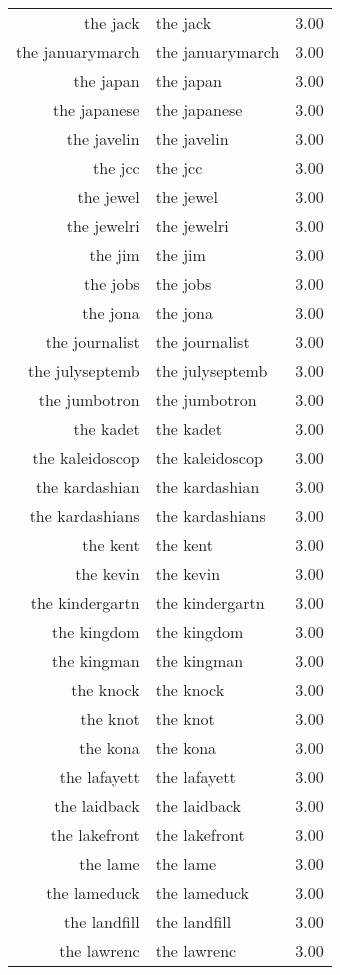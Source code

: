 \begin{table}[ht]
\begin{tabular}{rlr}
  the jack & the jack & 3.00 \\ 
  the januarymarch & the januarymarch & 3.00 \\ 
  the japan & the japan & 3.00 \\ 
  the japanese & the japanese & 3.00 \\ 
  the javelin & the javelin & 3.00 \\ 
  the jcc & the jcc & 3.00 \\ 
  the jewel & the jewel & 3.00 \\ 
  the jewelri & the jewelri & 3.00 \\ 
  the jim & the jim & 3.00 \\ 
  the jobs & the jobs & 3.00 \\ 
  the jona & the jona & 3.00 \\ 
  the journalist & the journalist & 3.00 \\ 
  the julyseptemb & the julyseptemb & 3.00 \\ 
  the jumbotron & the jumbotron & 3.00 \\ 
  the kadet & the kadet & 3.00 \\ 
  the kaleidoscop & the kaleidoscop & 3.00 \\ 
  the kardashian & the kardashian & 3.00 \\ 
  the kardashians & the kardashians & 3.00 \\ 
  the kent & the kent & 3.00 \\ 
  the kevin & the kevin & 3.00 \\ 
  the kindergartn & the kindergartn & 3.00 \\ 
  the kingdom & the kingdom & 3.00 \\ 
  the kingman & the kingman & 3.00 \\ 
  the knock & the knock & 3.00 \\ 
  the knot & the knot & 3.00 \\ 
  the kona & the kona & 3.00 \\ 
  the lafayett & the lafayett & 3.00 \\ 
  the laidback & the laidback & 3.00 \\ 
  the lakefront & the lakefront & 3.00 \\ 
  the lame & the lame & 3.00 \\ 
  the lameduck & the lameduck & 3.00 \\ 
  the landfill & the landfill & 3.00 \\ 
  the lawrenc & the lawrenc & 3.00 \\ 

\end{tabular}
\end{table}
